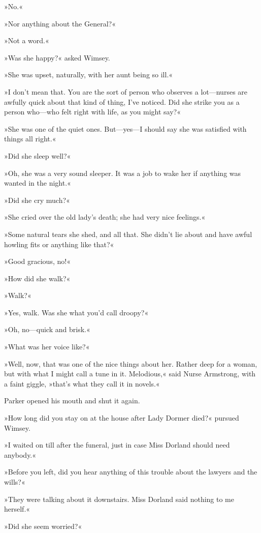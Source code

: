 »No.«

»Nor anything about the General?«

»Not a word.«

»Was she happy?« asked Wimsey.

»She was upset, naturally, with her aunt being so ill.«

»I don't mean that. You are the sort of person who observes a lot\allowbreak---\allowbreak nurses are awfully quick about that kind of thing, I've noticed. Did she strike you as a person who\allowbreak---\allowbreak who felt right with life, as you might say?«

»She was one of the quiet ones. But\allowbreak---\allowbreak yes---I should say she was satisfied with things all right.«

»Did she sleep well?«

»Oh, she was a very sound sleeper. It was a job to wake her if anything was wanted in the night.«

»Did she cry much?«

»She cried over the old lady's death; she had very nice feelings.«

»Some natural tears she shed, and all that. She didn't lie about and have awful howling fits or anything like that?«

»Good gracious, no!«

»How did she walk?«

»Walk?«

»Yes, walk. Was she what you'd call droopy?«

»Oh, no\allowbreak---\allowbreak quick and brisk.«

»What was her voice like?«

»Well, now, that was one of the nice things about her. Rather deep for a woman, but with what I might call a tune in it. Melodious,« said Nurse Armstrong, with a faint giggle, »that's what they call it in novels.«

Parker opened his mouth and shut it again.

»How long did you stay on at the house after Lady Dormer died?« pursued Wimsey.

»I waited on till after the funeral, just in case Miss Dorland should need anybody.«

»Before you left, did you hear anything of this trouble about the lawyers and the wills?«

»They were talking about it downstairs. Miss Dorland said nothing to me herself.«

»Did she seem worried?«

